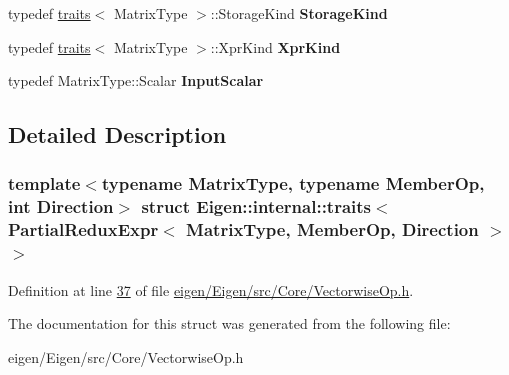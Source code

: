 \begin{DoxyCompactItemize}
typedef \hyperlink{struct_eigen_1_1internal_1_1traits}{traits}$<$ Matrix\+Type $>$\+::Storage\+Kind {\bfseries Storage\+Kind}
\item 
\mbox{\label{struct_eigen_1_1internal_1_1traits_3_01_partial_redux_expr_3_01_matrix_type_00_01_member_op_00_01_direction_01_4_01_4_ab185c3fff37e5e5253fdfc037c1abc16}} 
typedef \hyperlink{struct_eigen_1_1internal_1_1traits}{traits}$<$ Matrix\+Type $>$\+::Xpr\+Kind {\bfseries Xpr\+Kind}
\item 
\mbox{\label{struct_eigen_1_1internal_1_1traits_3_01_partial_redux_expr_3_01_matrix_type_00_01_member_op_00_01_direction_01_4_01_4_a9d3b60f0417ed934e2540d7e77464223}} 
typedef Matrix\+Type\+::\+Scalar {\bfseries Input\+Scalar}
\end{DoxyCompactItemize}


\subsection{Detailed Description}
\subsubsection*{template$<$typename Matrix\+Type, typename Member\+Op, int Direction$>$\newline
struct Eigen\+::internal\+::traits$<$ Partial\+Redux\+Expr$<$ Matrix\+Type, Member\+Op, Direction $>$ $>$}



Definition at line \hyperlink{eigen_2_eigen_2src_2_core_2_vectorwise_op_8h_source_l00037}{37} of file \hyperlink{eigen_2_eigen_2src_2_core_2_vectorwise_op_8h_source}{eigen/\+Eigen/src/\+Core/\+Vectorwise\+Op.\+h}.



The documentation for this struct was generated from the following file\+:\begin{DoxyCompactItemize}
\item 
eigen/\+Eigen/src/\+Core/\+Vectorwise\+Op.\+h\end{DoxyCompactItemize}
